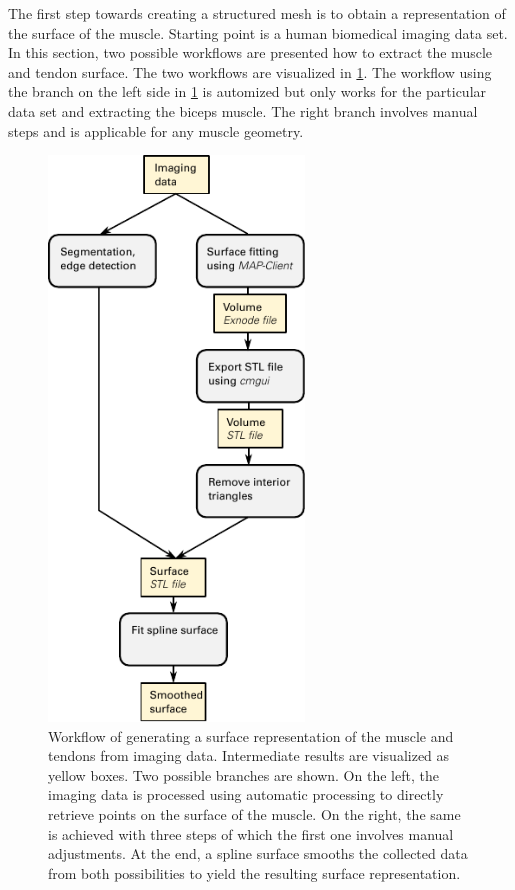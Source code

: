 The first step towards creating a structured mesh is to obtain a representation of the surface of the muscle. 
Starting point is a human biomedical imaging data set. In this section, two possible workflows are presented how to extract the muscle and tendon surface. 
The two workflows are visualized in \cref{fig:scheme_preprocessing}. The workflow using the branch on the left side in \cref{fig:scheme_preprocessing} is automized but only works for the particular data set and extracting the biceps muscle.
The right branch involves manual steps and is applicable for any muscle geometry.


\begin{figure}%
  \centering%
  \includegraphics[height=15cm]{images/fiber_creation/scheme_preprocessing.pdf}%
  \caption{Workflow of generating a surface representation of the muscle and tendons from imaging data. Intermediate results are visualized as yellow boxes. Two possible branches are shown. On the left, the imaging data is processed using automatic processing to directly retrieve points on the surface of the muscle. On the right, the same is achieved with three steps of which the first one involves manual adjustments. At the end, a spline surface smooths the collected data from both possibilities to yield the resulting surface representation.}%
  \label{fig:scheme_preprocessing}%
\end{figure}%


